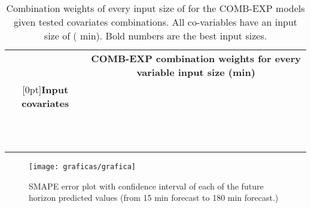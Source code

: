 \documentclass[energies,article,accept,moreauthors,pdftex,12pt,a4paper]{mdpi}
\newcommand{\comb}{COMB-EXP\xspace}
\begin{document}
\begin{table}[H]
\scriptsize \centering
 \begin{tabular}{cccccccccccc}
 \toprule
 &\multicolumn{11}{c}{{\bf \comb combination weights for every  variable input size (min)}}\\ \cline{2-12}
\raisebox{2ex}[0pt]{{\bf Input covariates}} &  &  &  &  &  &  &  &  &  &  & \\
 \midrule
    &  &  &  &  &  &  &  &  &  &  &  \\
\hline
    &  &  &  &  &  &  &  &  &  &  &  \\
\hline
    &  &  &  &  &  &  &  &  &  &  &  \\
\hline
    &  &  &  &  &  &  &  &  &  &  &  \\
\hline
    &  &  &  &  &  &  &  &  &  &  &  \\
\hline
    &  &  &  &  &  &  &  &  &  &  &  \\
\hline
    &  &  &  &  &  &  &  &  &  &  &  \\
\hline
   &  &  &  &  &  &  &  &  &  &  &  \\
\hline
   &  &  &  &  &  &  &  &  &  &  &  \\
\hline
   &  &  &  &  &  &  &  &  &  &  &  \\
\hline
  &  &  &  &  &  &  &  &  &  &  &  \\
 \bottomrule 
 \end{tabular}
 \normalsize
 \caption{Combination weights of every input size of  for the \comb models
 given tested covariates combinations. All co-variables have an input size of
  ( min). \protect\linebreak Bold numbers are the best input sizes.}
\label{tab:combs}
\end{table}

\begin{figure}[H]
 \centering
 \texttt{[image: graficas/grafica]}\\
 \caption{SMAPE error plot with  confidence interval of each of
 the  future horizon predicted values (from 15 min forecast to 180
 min forecast.)\label{fig:val-180}}
\end{figure}
\end{document}
